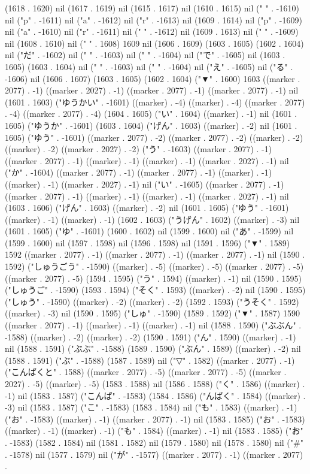 (1618 . 1620) nil (1617 . 1619) nil (1615 . 1617) nil (1610 . 1615) nil (" " . -1610) nil ("p" . -1611) nil ("a" . -1612) nil ("r" . -1613) nil (1609 . 1614) nil ("p" . -1609) nil ("a" . -1610) nil ("r" . -1611) nil (" " . -1612) nil (1609 . 1613) nil (" " . -1609) nil (1608 . 1610) nil (" " . 1608) 1609 nil (1606 . 1609) (1603 . 1605) (1602 . 1604) nil ("だ" . -1602) nil ("
" . -1603) nil (" " . -1604) nil ("で" . -1605) nil (1603 . 1605) (1603 . 1604) nil ("
" . -1603) nil (" " . -1604) nil ("え" . -1605) nil ("る" . -1606) nil (1606 . 1607) (1603 . 1605) (1602 . 1604) ("▼" . 1600) 1603 ((marker . 2077) . -1) ((marker . 2027) . -1) ((marker . 2077) . -1) ((marker . 2077) . -1) nil (1601 . 1603) ("ゆうかい" . -1601) ((marker) . -4) ((marker) . -4) ((marker . 2077) . -4) ((marker . 2077) . -4) (1604 . 1605) ("い" . 1604) ((marker) . -1) nil (1601 . 1605) ("ゆうか" . -1601) (1603 . 1604) ("げん" . 1603) ((marker) . -2) nil (1601 . 1605) ("ゆう" . -1601) ((marker . 2077) . -2) ((marker . 2077) . -2) ((marker) . -2) ((marker) . -2) ((marker . 2027) . -2) ("う" . -1603) ((marker . 2077) . -1) ((marker . 2077) . -1) ((marker) . -1) ((marker) . -1) ((marker . 2027) . -1) nil ("か" . -1604) ((marker . 2077) . -1) ((marker . 2077) . -1) ((marker) . -1) ((marker) . -1) ((marker . 2027) . -1) nil ("い" . -1605) ((marker . 2077) . -1) ((marker . 2077) . -1) ((marker) . -1) ((marker) . -1) ((marker . 2027) . -1) nil (1603 . 1606) ("げん" . 1603) ((marker) . -2) nil (1601 . 1605) ("ゆう" . -1601) ((marker) . -1) ((marker) . -1) (1602 . 1603) ("うげん" . 1602) ((marker) . -3) nil (1601 . 1605) ("ゆ" . -1601) (1600 . 1602) nil (1599 . 1600) nil ("あ" . -1599) nil (1599 . 1600) nil (1597 . 1598) nil (1596 . 1598) nil (1591 . 1596) ("▼" . 1589) 1592 ((marker . 2077) . -1) ((marker . 2077) . -1) ((marker . 2077) . -1) nil (1590 . 1592) ("しゅうごう" . -1590) ((marker) . -5) ((marker) . -5) ((marker . 2077) . -5) ((marker . 2077) . -5) (1594 . 1595) ("う" . 1594) ((marker) . -1) nil (1590 . 1595) ("しゅうご" . -1590) (1593 . 1594) ("そく" . 1593) ((marker) . -2) nil (1590 . 1595) ("しゅう" . -1590) ((marker) . -2) ((marker) . -2) (1592 . 1593) ("うそく" . 1592) ((marker) . -3) nil (1590 . 1595) ("しゅ" . -1590) (1589 . 1592) ("▼" . 1587) 1590 ((marker . 2077) . -1) ((marker) . -1) ((marker) . -1) nil (1588 . 1590) ("ぶぶん" . -1588) ((marker) . -2) ((marker) . -2) (1590 . 1591) ("ん" . 1590) ((marker) . -1) nil (1588 . 1591) ("ぶぶ" . -1588) (1589 . 1590) ("ぶん" . 1589) ((marker) . -2) nil (1588 . 1591) ("ぶ" . -1588) (1587 . 1589) nil ("▽" . 1582) ((marker . 2077) . -1) ("こんぱくと" . 1588) ((marker . 2077) . -5) ((marker . 2077) . -5) ((marker . 2027) . -5) ((marker) . -5) (1583 . 1588) nil (1586 . 1588) ("く" . 1586) ((marker) . -1) nil (1583 . 1587) ("こんぱ" . -1583) (1584 . 1586) ("んぱく" . 1584) ((marker) . -3) nil (1583 . 1587) ("こ" . -1583) (1583 . 1584) nil ("も" . 1583) ((marker) . -1) ("お" . -1583) ((marker) . -1) ((marker . 2077) . -1) nil (1583 . 1585) ("お" . -1583) ((marker) . -1) ((marker) . -1) ("も" . 1584) ((marker) . -1) nil (1583 . 1585) ("お" . -1583) (1582 . 1584) nil (1581 . 1582) nil (1579 . 1580) nil (1578 . 1580) nil ("#" . -1578) nil (1577 . 1579) nil ("が" . -1577) ((marker . 2077) . -1) ((marker . 2077) . 